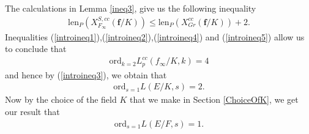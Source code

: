 \documentclass[reqno,10pt]{amsart}
\newcommand{\q}{\mathbb{Q}}
\newcommand{\f}{\mathbf{f}}
\theoremstyle{plain}
\newtheorem{rem}[thm]{Remark}
\theoremstyle{definition}
\begin{document}
The calculations in Lemma \ref{ineq3}, give us the following inequality
\begin{align} \label{introineq5}
    \mathrm{len}_P(X^{S,cc}_{F_\infty}(\f/K)) \leq \mathrm{len}_P(X^{cc}_{Gr}(\f/K)) + 2.
\end{align}
Inequalities (\ref{introineq1}),(\ref{introineq2}),(\ref{introineq4}) and (\ref{introineq5}) allow us to conclude that
\begin{align*}
     \mathrm{ord}_{k=2} L_p^{cc}(f_\infty/K,k) = 4
\end{align*}
and hence by (\ref{introineq3}), we obtain that
\begin{align*}
    \mathrm{ord}_{s=1}L(E/K,s) = 2.
\end{align*}
Now by the choice of the field $K$ that we make in Section \ref{ChoiceOfK}, we get our result that
\begin{align*}
    \mathrm{ord}_{s=1}L(E/F,s) = 1.
\end{align*}

\end{document}
